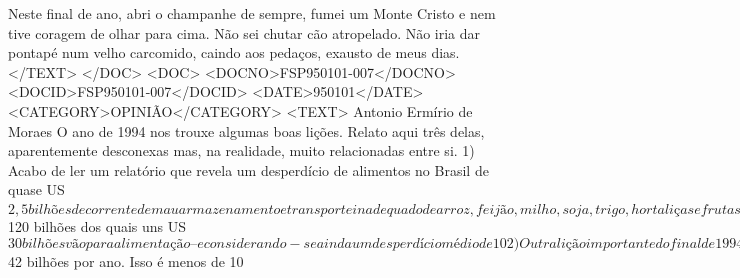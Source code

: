 Neste final de ano, abri o champanhe de sempre, fumei um Monte Cristo e nem tive coragem de olhar para cima. Não sei chutar cão atropelado. Não iria dar pontapé num velho carcomido, caindo aos pedaços, exausto de meus dias.
</TEXT>
</DOC>
<DOC>
<DOCNO>FSP950101-007</DOCNO>
<DOCID>FSP950101-007</DOCID>
<DATE>950101</DATE>
<CATEGORY>OPINIÃO</CATEGORY>
<TEXT>
Antonio Ermírio de Moraes 
O ano de 1994 nos trouxe algumas boas lições. Relato aqui três delas, aparentemente desconexas mas, na realidade, muito relacionadas entre si.
1) Acabo de ler um relatório que revela um desperdício de alimentos no Brasil de quase US$ 2,5 bilhões decorrente de mau armazenamento e transporte inadequado de arroz, feijão, milho, soja, trigo, hortaliças e frutas. É lamentável ver isso acontecer num país em que tanta gente passa fome por falta de acesso ao que comer.
Além disso, há o desperdício do consumidor, especialmente das classes mais altas, que insiste em pôr no lixo muita coisa que os povos mais ricos guardam na geladeira para comer no dia seguinte. É difícil precisar o volume desse desperdício. Mas, considerando-se que aquelas classes possuem uma renda de aproximadamente US$ 120 bilhões dos quais uns US$ 30 bilhões vão para alimentação e considerando-se ainda um desperdício médio de 10%
2) Outra lição importante do final de 1994 veio do México. Ela mostrou que apoiar um plano de estabilização em uma âncora cambial apenas é extremamente perigoso. A estabilização econômica só dá certo quando o ajuste fiscal é feito de modo completo e definitivo. O Brasil precisa levar isso a sério. Do contrário, em dois ou três anos, nossas reservas também irão para o espaço e a crise cambial nos atingirá em cheio como atingiu o México.
3) Uma outra lição importante, finalmente, veio do Mercosul. A Argentina mostra-se cada vez mais preocupada com o novo mercado por julgar que, tendo a sua indústria sido sucateada por anos de recessão e abertura descontrolada das importações, o Brasil entrará em nítida vantagem comparativa passando a mais vender do que comprar no terreno dos produtos industriais.
Esse raciocínio pressupõe que nossa indústria continue crescendo e se modernizando o que não está garantido com o atual câmbio deprimido que afeta os exportadores e com a entrada desregrada de produtos importados que afeta os produtores do mercado interno.
O Brasil exporta cerca de US$ 42 bilhões por ano. Isso é menos de 10%
